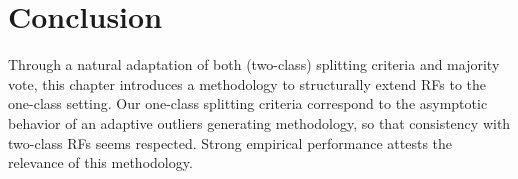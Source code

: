 


\section{Conclusion}
Through a natural adaptation of both (two-class) splitting criteria and majority vote, this chapter introduces a methodology to structurally extend RFs to the one-class setting.
%
Our one-class splitting criteria correspond to the asymptotic behavior of an adaptive outliers generating methodology, so that consistency with two-class RFs seems respected.
%
Strong empirical performance attests the relevance of this methodology.


